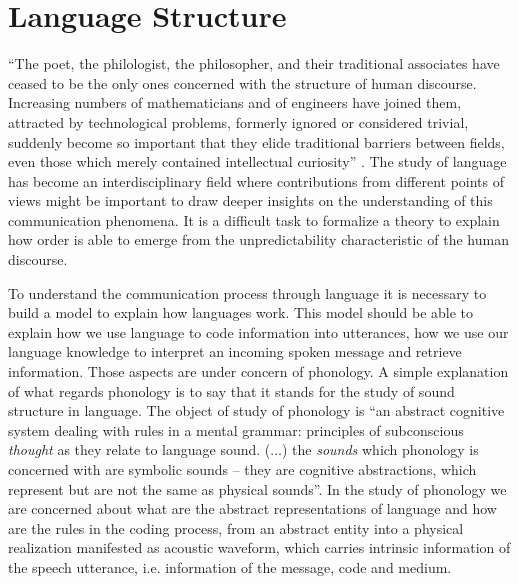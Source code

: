 \chapter{Language Structure}
``The poet, the philologist, the philosopher, and their traditional associates have ceased
to be the only ones concerned with the structure of human discourse. Increasing numbers
of mathematicians and of engineers have joined them, attracted by technological problems,
formerly ignored or considered trivial, suddenly become so important that they elide traditional
barriers between fields, even those which merely contained intellectual curiosity'' \cite{mandelbrot1965}.
The study of language has become an interdisciplinary field
where contributions from different points of views might be important to draw deeper insights
on the understanding of this communication phenomena. It is a difficult task
to formalize a theory to explain how order is able to emerge from the unpredictability characteristic 
of the human discourse.

To understand the communication process through language it is necessary to build a model to explain how languages work. 
This model should be able to explain how we use language to code information into utterances, how we use our language knowledge 
to interpret an incoming spoken message and retrieve information. Those aspects are under concern 
of phonology. A simple explanation of what regards phonology is to say that it stands for the study of sound structure in language. 
The object of study of phonology is ``an abstract cognitive system dealing with rules in a mental grammar: principles of subconscious 
\textit{thought} as they relate to language sound. (...) the \textit{sounds} which phonology is concerned with are symbolic sounds -- 
they are cognitive abstractions, which represent but are not the same as physical sounds''\citep{odden2005}. 
In the study of phonology we are concerned about what are the abstract representations of language and how are the rules in 
the coding process, from an abstract entity into a physical realization manifested as acoustic waveform, which carries 
intrinsic information of the speech utterance, i.e. information of the message, code and medium.

